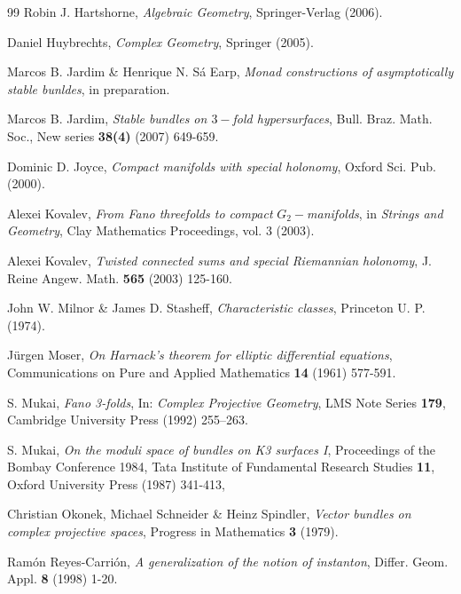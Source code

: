 \documentclass{article}
\begin{document}
\begin{thebibliography}{99}
 Robin J. Hartshorne, \emph{Algebraic Geometry},
Springer-Verlag (2006).

 Daniel Huybrechts, \emph{Complex Geometry},
Springer (2005).

 Marcos B. Jardim \& Henrique N. S\'a Earp, \emph{Monad constructions of asymptotically stable bunldes}, in preparation.

 Marcos B. Jardim, \emph{Stable bundles on $3-$fold hypersurfaces}, Bull. Braz. Math. Soc., New series \textbf{38(4)} (2007) 649-659. 


 Dominic D. Joyce, \emph{Compact manifolds with special
holonomy}, Oxford Sci. Pub. (2000).

 Alexei Kovalev, \emph{From Fano threefolds
to compact }$G_{2}-$\emph{manifolds}, in \emph{Strings and Geometry}, Clay
Mathematics Proceedings, vol. 3 (2003).

 Alexei Kovalev, \emph{Twisted connected sums
and special Riemannian holonomy}, J. Reine Angew. Math. \textbf{565} (2003)
125-160.

 John W. Milnor \& James D. Stasheff, \emph{%
Characteristic classes}, Princeton U. P. (1974).

 J\"{u}rgen Moser, \emph{On Harnack's theorem for
elliptic differential equations}, Communications on Pure and Applied
Mathematics \textbf{14} (1961) 577-591.

S. Mukai, \emph{Fano 3-folds},
In: \emph{Complex Projective Geometry}, LMS Note Series \textbf{179}, Cambridge University Press (1992) 255--263.

S. Mukai, \emph{On the moduli space of bundles on K3 surfaces I}, Proceedings of the Bombay Conference 1984, Tata Institute of Fundamental Research Studies \textbf{11}, Oxford University Press (1987) 341-413, 

 Christian Okonek, Michael
Schneider \& Heinz Spindler, \emph{Vector bundles on complex projective
spaces}, Progress in Mathematics \textbf{3 }(1979).

 Ram\'on Reyes-Carri\'on, \emph{A generalization of the notion of instanton}, Differ. Geom.  Appl. \textbf{8} (1998) 1-20.


\end{thebibliography}
\end{document}
